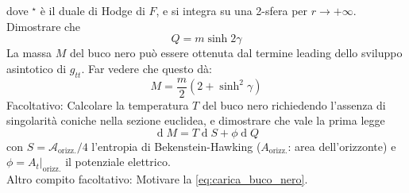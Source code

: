 \documentclass[]{scrartcl}
\renewcommand{\d}[1]{\ensuremath{\operatorname{d}\!{#1}}}
\begin{document}
dove $ {}^\star $ è il duale di Hodge di $ F $, e si integra su una 2-sfera per $ r \rightarrow + \infty $.
Dimostrare che
\begin{equation}
  \label{eq:carica_massa}
  Q = m \sinh 2 \gamma
\end{equation}
La massa $ M $ del buco nero può essere ottenuta dal termine leading dello sviluppo asintotico di $ g_{tt} $. Far vedere che questo dà:
\begin{equation}
  \label{eq:massa_buco_nero}
  M = \frac{m}{2} \left( 2 + \sinh^2 \gamma \right)
\end{equation}
Facoltativo: Calcolare la temperatura $ T $ del buco nero richiedendo l'assenza di singolarità coniche nella sezione euclidea, e dimostrare
che vale la prima legge
\begin{equation}
  \label{eq:prima_legge}
  \d M = T \d S + \phi \d Q
\end{equation}
con $ S = \mathcal{A}_{\mathrm{orizz.}} \slash 4 $ l'entropia di Bekenstein-Hawking ($ A_{\mathrm{orizz.}} $: area dell'orizzonte) e $ \phi = A_t \lvert_{\mathrm{orizz.}} $
il potenziale elettrico. \\
Altro compito facoltativo: Motivare la \eqref{eq:carica_buco_nero}.
\end{document}
